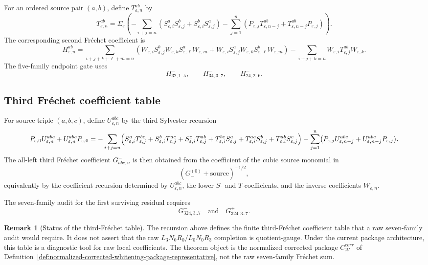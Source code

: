 \documentclass[11pt,a4paper]{amsart}
\def\corr{corr}%
\theoremstyle{plain}
\theoremstyle{definition}
\newtheorem{remark}[theorem]{Remark}
\newcommand{\corr}{\mathrm{corr}}
\begin{document}
For an ordered source pair \((a,b)\), define \(T_{\varepsilon,n}^{ab}\) by
\[
T_{\varepsilon,n}^{ab}
=
\Sigma_\varepsilon
\left(
-\sum_{i+j=n}
(S_{\varepsilon,i}^aS_{\varepsilon,j}^b+
 S_{\varepsilon,i}^bS_{\varepsilon,j}^a)
-
\sum_{j=1}^{n}
(P_{\varepsilon,j}T_{\varepsilon,n-j}^{ab}
+
T_{\varepsilon,n-j}^{ab}P_{\varepsilon,j})
\right).
\]
The corresponding second Fr\'echet coefficient is
\[
H_{\varepsilon,n}^{ab}
=
\sum_{i+j+k+\ell+m=n}
\left(
W_{\varepsilon,i}S_{\varepsilon,j}^bW_{\varepsilon,k}
S_{\varepsilon,\ell}^aW_{\varepsilon,m}
+
W_{\varepsilon,i}S_{\varepsilon,j}^aW_{\varepsilon,k}
S_{\varepsilon,\ell}^bW_{\varepsilon,m}
\right)
-
\sum_{i+j+k=n}
W_{\varepsilon,i}T_{\varepsilon,j}^{ab}W_{\varepsilon,k}.
\]
The five-family endpoint gate uses
\[
H^-_{32,1..5},\qquad
H^-_{34,3..7},\qquad
H^-_{24,2..6}.
\]

\subsection{Third Fr\'echet coefficient table}
\label{subsec:third-frechet-coefficient-table}

For source triple \((a,b,c)\), define \(U_{\varepsilon,n}^{abc}\) by the third
Sylvester recursion
\[
P_{\varepsilon,0}U_{\varepsilon,n}^{abc}
+
U_{\varepsilon,n}^{abc}P_{\varepsilon,0}
=
-\sum_{i+j=n}
\Bigl(
S_{\varepsilon,i}^{a}T_{\varepsilon,j}^{bc}
+S_{\varepsilon,i}^{b}T_{\varepsilon,j}^{ac}
+S_{\varepsilon,i}^{c}T_{\varepsilon,j}^{ab}
+
T_{\varepsilon,i}^{bc}S_{\varepsilon,j}^{a}
+T_{\varepsilon,i}^{ac}S_{\varepsilon,j}^{b}
+T_{\varepsilon,i}^{ab}S_{\varepsilon,j}^{c}
\Bigr)
-
\sum_{j=1}^{n}
\bigl(
P_{\varepsilon,j}U_{\varepsilon,n-j}^{abc}
+
U_{\varepsilon,n-j}^{abc}P_{\varepsilon,j}
\bigr).
\]
The all-left third Fr\'echet coefficient \(G^-_{abc,n}\) is then obtained from
the coefficient of the cubic source monomial in
\[
(G_-^{(0)}+\text{source})^{-1/2},
\]
equivalently by the coefficient recursion determined by
\(U_{\varepsilon,n}^{abc}\), the lower \(S\)- and \(T\)-coefficients, and the
inverse coefficients \(W_{\varepsilon,n}\).

The seven-family audit for the first surviving residual requires
\[
G^-_{324,3..7}
\quad\text{and}\quad
G^+_{324,3..7}.
\]

\begin{remark}[Status of the third-Fr\'echet table]
\label{rem:status-third-frechet-table}
The recursion above defines the finite third-Fr\'echet coefficient table
that a raw seven-family audit would require.  It does not assert that the
raw \(L_3N_0R_0/L_0N_0R_3\) completion is quotient-gauge.  Under the
current package architecture, this table is a diagnostic tool for raw local
coefficients.  The theorem object is the normalized corrected package
\(C_{\mathcal W}^{\corr}\) of
Definition~\ref{def:normalized-corrected-whitening-package-representative},
not the raw seven-family Fr\'echet sum.
\end{remark}
\end{document}
